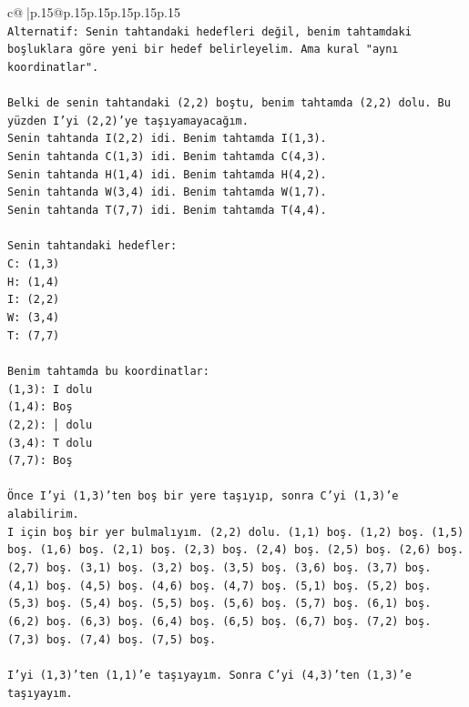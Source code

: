 \documentclass{article}
\begin{document}
{\begin{supertabular}{c@{$\;$}|p{.15\linewidth}@{}p{.15\linewidth}p{.15\linewidth}p{.15\linewidth}p{.15\linewidth}p{.15\linewidth}}
{{{\\ 
\texttt{Alternatif: Senin tahtandaki hedefleri değil, benim tahtamdaki boşluklara göre yeni bir hedef belirleyelim. Ama kural "aynı koordinatlar".} \\
\\ 
\texttt{Belki de senin tahtandaki (2,2) boştu, benim tahtamda (2,2) dolu. Bu yüzden I'yi (2,2)'ye taşıyamayacağım.} \\
\texttt{Senin tahtanda I(2,2) idi. Benim tahtamda I(1,3).} \\
\texttt{Senin tahtanda C(1,3) idi. Benim tahtamda C(4,3).} \\
\texttt{Senin tahtanda H(1,4) idi. Benim tahtamda H(4,2).} \\
\texttt{Senin tahtanda W(3,4) idi. Benim tahtamda W(1,7).} \\
\texttt{Senin tahtanda T(7,7) idi. Benim tahtamda T(4,4).} \\
\\ 
\texttt{Senin tahtandaki hedefler:} \\
\texttt{C: (1,3)} \\
\texttt{H: (1,4)} \\
\texttt{I: (2,2)} \\
\texttt{W: (3,4)} \\
\texttt{T: (7,7)} \\
\\ 
\texttt{Benim tahtamda bu koordinatlar:} \\
\texttt{(1,3): I dolu} \\
\texttt{(1,4): Boş} \\
\texttt{(2,2): │ dolu} \\
\texttt{(3,4): T dolu} \\
\texttt{(7,7): Boş} \\
\\ 
\texttt{Önce I'yi (1,3)'ten boş bir yere taşıyıp, sonra C'yi (1,3)'e alabilirim.} \\
\texttt{I için boş bir yer bulmalıyım. (2,2) dolu. (1,1) boş. (1,2) boş. (1,5) boş. (1,6) boş. (2,1) boş. (2,3) boş. (2,4) boş. (2,5) boş. (2,6) boş. (2,7) boş. (3,1) boş. (3,2) boş. (3,5) boş. (3,6) boş. (3,7) boş. (4,1) boş. (4,5) boş. (4,6) boş. (4,7) boş. (5,1) boş. (5,2) boş. (5,3) boş. (5,4) boş. (5,5) boş. (5,6) boş. (5,7) boş. (6,1) boş. (6,2) boş. (6,3) boş. (6,4) boş. (6,5) boş. (6,7) boş. (7,2) boş. (7,3) boş. (7,4) boş. (7,5) boş.} \\
\\ 
\texttt{I'yi (1,3)'ten (1,1)'e taşıyayım. Sonra C'yi (4,3)'ten (1,3)'e taşıyayım.} \\
}}}
\end{supertabular}}
\end{document}
